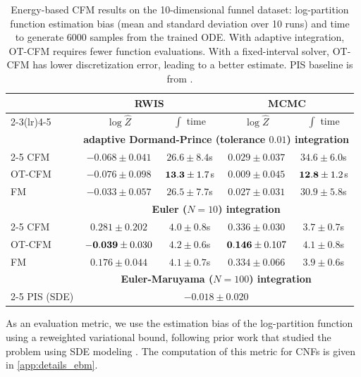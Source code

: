 \documentclass[10pt]{article}
\theoremstyle{plain}
\theoremstyle{definition}
\theoremstyle{remark}
\begin{document}
\begin{table}[t]
%
\caption{Energy-based CFM results on the 10-dimensional funnel dataset: log-partition function estimation bias (mean and standard deviation over 10 runs) and time to generate 6000 samples from the trained ODE. With adaptive integration, OT-CFM requires fewer function evaluations. With a fixed-interval solver, OT-CFM has lower discretization error, leading to a better estimate. PIS baseline is from \citet{zhang2022path}.}\vspace*{-1em}
\centering
{
\begin{tabular}{@{}lcccc}
\toprule
&\multicolumn{2}{c}{RWIS}&\multicolumn{2}{c}{MCMC}\\
\cmidrule(lr){2-3}\cmidrule(lr){4-5}
& $\log \hat Z$ & $\int$ time & $\log \hat Z$ & $\int$ time \\\midrule
&\multicolumn{4}{c}{\footnotesize\bf adaptive Dormand-Prince (tolerance $0.01$) integration} \\\cmidrule(lr){2-5}
CFM & $-0.068\pm0.041$ & $26.6\pm8.4$s & $0.029\pm0.037$ & $34.6\pm6.0$s \\
OT-CFM & $-0.076\pm0.098$ & ${\bf 13.3}\pm1.7$s & $0.009\pm0.045$ & ${\bf 12.8}\pm1.2$s \\
FM & $-0.033\pm0.057$ & $26.5\pm7.7$s & $0.027\pm0.031$ & $30.9\pm5.8$s \\
&\multicolumn{4}{c}{\footnotesize\bf Euler ($N=10$) integration} \\\cmidrule(lr){2-5}
CFM & $0.281\pm0.202$ & $4.0\pm0.8$s & $0.336\pm0.030$ & $3.7\pm0.7$s \\
OT-CFM & ${\bf -0.039}\pm0.030$ & $4.2\pm0.6$s & ${\bf 0.146}\pm0.107$ & $4.1\pm0.8$s \\
FM & $0.176\pm0.044$ & $4.1\pm0.7$s & $0.334\pm0.066$ & $3.9\pm0.6$s \\
&\multicolumn{4}{c}{\footnotesize\bf Euler-Maruyama ($N=100$) integration} \\\cmidrule(lr){2-5}
PIS (SDE) & \multicolumn{4}{c}{$-0.018\pm0.020$} \\
\bottomrule
\end{tabular}
}
\label{tab:ebm_results}
\end{table}

As an evaluation metric, we use the estimation bias of the log-partition function using a reweighted variational bound, following prior work that studied the problem using SDE modeling \citep{zhang2022path}. The computation of this metric for CNFs is given in \autoref{app:details_ebm}. 
\end{document}
